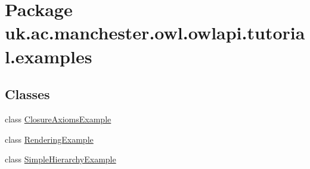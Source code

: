 \hypertarget{namespaceuk_1_1ac_1_1manchester_1_1owl_1_1owlapi_1_1tutorial_1_1examples}{\section{Package uk.\-ac.\-manchester.\-owl.\-owlapi.\-tutorial.\-examples}
\label{namespaceuk_1_1ac_1_1manchester_1_1owl_1_1owlapi_1_1tutorial_1_1examples}
}
\subsection*{Classes}
\begin{DoxyCompactItemize}
\item 
class \hyperlink{classuk_1_1ac_1_1manchester_1_1owl_1_1owlapi_1_1tutorial_1_1examples_1_1_closure_axioms_example}{Closure\-Axioms\-Example}
\item 
class \hyperlink{classuk_1_1ac_1_1manchester_1_1owl_1_1owlapi_1_1tutorial_1_1examples_1_1_rendering_example}{Rendering\-Example}
\item 
class \hyperlink{classuk_1_1ac_1_1manchester_1_1owl_1_1owlapi_1_1tutorial_1_1examples_1_1_simple_hierarchy_example}{Simple\-Hierarchy\-Example}
\end{DoxyCompactItemize}
